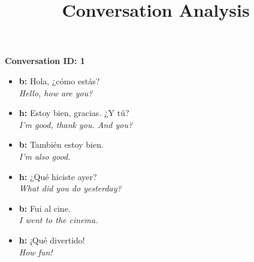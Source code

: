 \documentclass{article}
\title{Conversation Analysis}
\newcommand{\utterance}[3]{
    \textbf{#1} #2 \\
    \textit{#3}
}
\begin{document}
\textbf{Conversation ID: 1}
\begin{itemize}[label={}, leftmargin=0pt, itemsep=0.5em]
    \item \utterance{b:}{Hola, ¿cómo estás?}{Hello, how are you?}
    \item \utterance{h:}{Estoy bien, gracias. ¿Y tú?}{I'm good, thank you. And you?}
    \item \utterance{b:}{También estoy bien.}{I'm also good.}
    \item \utterance{h:}{¿Qué hiciste ayer?}{What did you do yesterday?}
    \item \utterance{b:}{Fui al cine.}{I went to the cinema.}
    \item \utterance{h:}{¡Qué divertido!}{How fun!}
\end{itemize}
\end{document}
